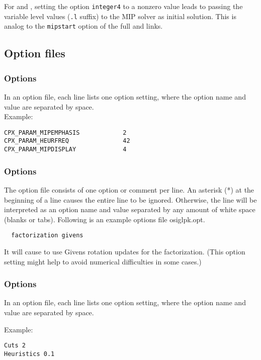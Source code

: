 For \OSICPLEX and \OSIGUROBI, setting the \GAMS option \texttt{integer4} to a nonzero value leads to passing the variable level values (\texttt{.l} suffix) to the MIP solver as initial solution. This is analog to the \texttt{mipstart} option of the full \CPLEX and \GUROBI links.

\subsection{Option files}
\label{sub:osioptions}

\subsubsection{\OSICPLEX Options}
In an \OSICPLEX option file, each line lists one option setting, where the option name and value are separated by space.\\
Example:
\begin{verbatim}
CPX_PARAM_MIPEMPHASIS            2
CPX_PARAM_HEURFREQ               42
CPX_PARAM_MIPDISPLAY             4
\end{verbatim}

\subsubsection{\OSIGLPK Options}

The \OSIGLPK option file consists of one option or comment per line.
An asterisk (*) at the beginning of a line causes the entire line to be ignored.
Otherwise, the line will be interpreted as an option name and value separated by any amount of white space (blanks or tabs).
Following is an example options file osiglpk.opt.
\begin{verbatim}
  factorization givens
\end{verbatim}
It will cause \OSIGLPK to use Givens rotation updates for the factorization. (This option setting might help to avoid numerical difficulties in some cases.)



\subsubsection{\OSIGUROBI Options}
In an \OSICPLEX option file, each line lists one option setting, where the option name and value are separated by space.

Example:
\begin{verbatim}
Cuts 2
Heuristics 0.1
\end{verbatim}

